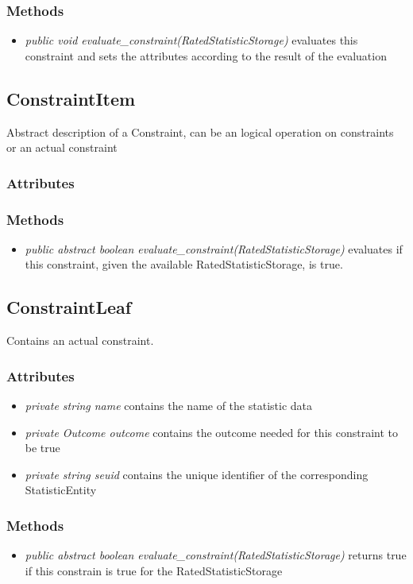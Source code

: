 \subsubsection{Methods}
\begin{itemize}
	\item \textit{ public void evaluate\_constraint(RatedStatisticStorage)  }
	evaluates this constraint and sets the attributes according to the result of the evaluation
\end{itemize}



\subsection{ConstraintItem}
	Abstract description of a Constraint, can be an logical operation on constraints or an actual constraint
\subsubsection{Attributes}
\subsubsection{Methods}
\begin{itemize}
	\item \textit{ public abstract boolean evaluate\_constraint(RatedStatisticStorage) }
	evaluates if this constraint, given the available RatedStatisticStorage, is true. 
\end{itemize}		


\subsection{ConstraintLeaf }
Contains an actual constraint.

\subsubsection{Attributes}
\begin{itemize}
	\item \textit{ private string name }
	contains the name of the statistic data
	\item \textit{ private Outcome outcome }
	contains the outcome needed for this constraint to be true
	\item \textit{ private string seuid }
	contains the unique identifier of the corresponding StatisticEntity
\end{itemize}
\subsubsection{Methods}
\begin{itemize}
	\item \textit{ public abstract boolean evaluate\_constraint(RatedStatisticStorage) }
	returns true if this constrain is true for the RatedStatisticStorage
\end{itemize}


